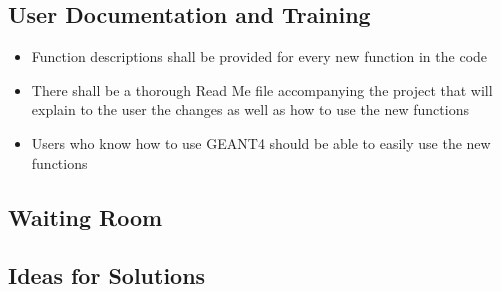 \documentclass[12pt]{article}
\begin{document}
\subsection{User Documentation and Training} %
\begin{itemize}
	\item Function descriptions shall be provided for every new function in the code
	\item There shall be a thorough Read Me file accompanying the project that will explain to the user the changes as well as how to use the new functions
	\item Users who know how to use GEANT4 should be able to easily use the new functions
\end{itemize}

\subsection{Waiting Room} %

\subsection{Ideas for Solutions} %
\end{document}
